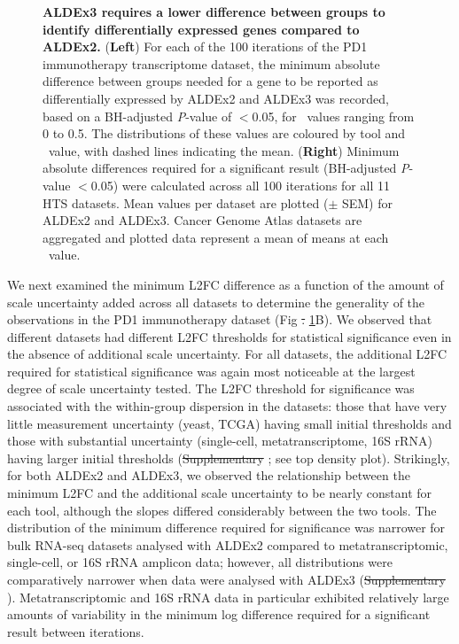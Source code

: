\documentclass[10pt,letterpaper]{article}
\providecommand{\DIFdeltex}[1]{{\protect\color{red}\sout{#1}}}                      %
\providecommand{\DIFdelbegin}{} %
\providecommand{\DIFdelend}{} %
\providecommand{\DIFdel}[1]{\texorpdfstring{\DIFdeltex{#1}}{}} %
\newcommand{\DIFscaledelfig}{0.5}
\newlength{\DIFdelgraphicswidth} %
\newlength{\DIFdelgraphicsheight} %
\newcommand{\DIFdelincludegraphics}[2][]{%
\sbox{\DIFdelgraphicsbox}{\DIFOincludegraphics[#1]{#2}}%
\settoboxwidth{\DIFdelgraphicswidth}{\DIFdelgraphicsbox} %
\settoboxtotalheight{\DIFdelgraphicsheight}{\DIFdelgraphicsbox} %
\scalebox{\DIFscaledelfig}{%
\parbox[b]{\DIFdelgraphicswidth}{\usebox{\DIFdelgraphicsbox}\\[-\baselineskip] \rule{\DIFdelgraphicswidth}{0em}}\llap{\resizebox{\DIFdelgraphicswidth}{\DIFdelgraphicsheight}{%
\setlength{\unitlength}{\DIFdelgraphicswidth}%
\begin{picture}(1,1)%
\thicklines\linethickness{2pt} %
{\color[rgb]{1,0,0}\put(0,0){\framebox(1,1){}}}%
{\color[rgb]{1,0,0}\put(0,0){\line( 1,1){1}}}%
{\color[rgb]{1,0,0}\put(0,1){\line(1,-1){1}}}%
\end{picture}%
}\hspace*{3pt}}} %
} %
\DeclareRobustCommand{\DIFdelbegin}{\DIFOdelbegin \let\includegraphics\DIFdelincludegraphics} %
\DeclareRobustCommand{\DIFdelend}{\DIFOaddend \let\includegraphics\DIFOincludegraphics} %
\begin{document}
\begin{figure}[H]
    \centering
    \caption{\textbf{ALDEx3 requires a lower difference between groups to identify differentially expressed genes compared to ALDEx2.} (\textbf{Left}) For each of the 100 iterations of the PD1 immunotherapy transcriptome dataset, the minimum absolute difference between groups needed for a gene to be reported as differentially expressed by ALDEx2 and ALDEx3 was recorded, based on a BH-adjusted \textit{P}-value of $<$0.05, for \textgamma~values ranging from 0 to 0.5. The distributions of these values are coloured by tool and \textgamma~value, with dashed lines indicating the mean. (\textbf{Right}) Minimum absolute differences required for a significant result (BH-adjusted \textit{P}-value $<$0.05) were calculated across all 100 iterations for all 11 HTS datasets. Mean values per dataset are plotted ($\pm$ SEM) for ALDEx2 and ALDEx3. Cancer Genome Atlas datasets are aggregated and plotted data represent a mean of means at each \textgamma~value.}
    \label{fig:density}
\end{figure}

We next examined the minimum L2FC difference as a function of the amount of scale uncertainty added across all datasets to determine the generality of the observations in the PD1 immunotherapy dataset (Fig \DIFdelbegin \DIFdel{. }\DIFdelend \ref{fig:density}B). We observed that different datasets had different L2FC thresholds for statistical significance even in the absence of additional scale uncertainty. For all datasets, the additional L2FC required for statistical significance was again most noticeable at the largest degree of scale uncertainty tested. The L2FC threshold for significance was associated with the within-group dispersion in the datasets: those that have very little measurement uncertainty (yeast, TCGA) having small initial thresholds and those with substantial uncertainty (single-cell, metatranscriptome, 16S rRNA) having larger initial thresholds (\DIFdelbegin \DIFdel{Supplementary }\DIFdelend {}; see top density plot). Strikingly, for both ALDEx2 and ALDEx3, we observed the relationship between the minimum L2FC and the additional scale uncertainty to be nearly constant for each tool, although the slopes differed considerably between the two tools. The distribution of the minimum difference required for significance was narrower for bulk RNA-seq datasets analysed with ALDEx2 compared to metatranscriptomic, single-cell, or 16S rRNA amplicon data; however, all distributions were comparatively narrower when data were analysed with ALDEx3 (\DIFdelbegin \DIFdel{Supplementary }\DIFdelend {}). Metatranscriptomic and 16S rRNA data in particular exhibited relatively large amounts of variability in the minimum log difference required for a significant result between iterations. 
\end{document}
